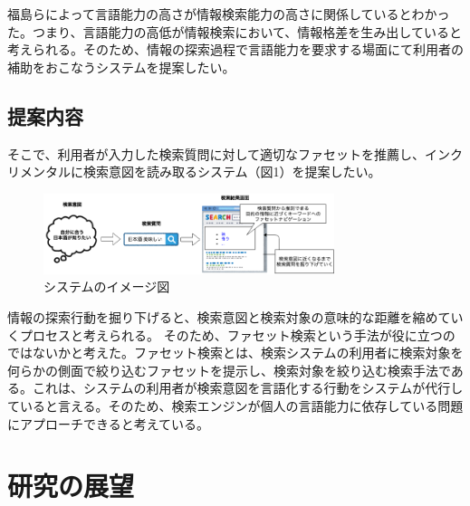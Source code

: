 \documentclass[a4j,11pt, twocolumn]{jarticle}
\begin{document}
 福島らによって言語能力の高さが情報検索能力の高さに関係しているとわかった\cite{fukushima}。つまり、言語能力の高低が情報検索において、情報格差を生み出していると考えられる。そのため、情報の探索過程で言語能力を要求する場面にて利用者の補助をおこなうシステムを提案したい。
\subsection{提案内容}

 そこで、利用者が入力した検索質問に対して適切なファセットを推薦し、インクリメンタルに検索意図を読み取るシステム（図1）を提案したい。

 \begin{figure}[h]
   \includegraphics[width=85mm]{./new_ir_with_navi.png}
   \caption{システムのイメージ図}
 \end{figure}
 
 情報の探索行動を掘り下げると、検索意図と検索対象の意味的な距離を縮めていくプロセスと考えられる。 そのため、ファセット検索という手法が役に立つのではないかと考えた。ファセット検索とは、検索システムの利用者に検索対象を何らかの側面で絞り込むファセットを提示し、検索対象を絞り込む検索手法である\cite{faceted}。これは、システムの利用者が検索意図を言語化する行動をシステムが代行していると言える。そのため、検索エンジンが個人の言語能力に依存している問題にアプローチできると考えている。
\section{研究の展望}
\end{document}
